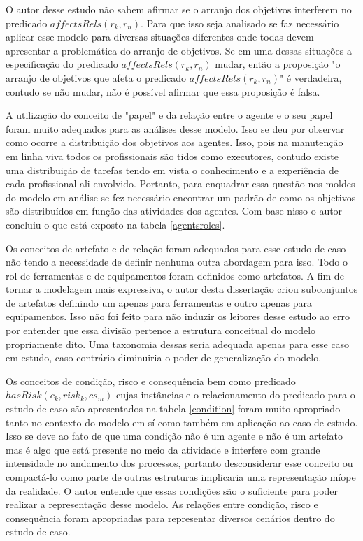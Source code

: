 O autor desse estudo não sabem afirmar se o arranjo dos objetivos interferem no predicado $affectsRels(r_k,r_n)$. Para que isso seja analisado se faz necessário aplicar esse modelo para diversas situações diferentes onde todas devem apresentar a problemática do arranjo de objetivos. Se em uma dessas situações a especificação do predicado $affectsRels(r_k,r_n)$ mudar, então a proposição "o arranjo de objetivos que afeta o predicado $affectsRels(r_k,r_n)$" é verdadeira, contudo se não mudar, não é possível afirmar que essa proposição é falsa. 

A utilização do conceito de "papel" e da relação entre o agente e o seu papel foram muito adequados para as análises desse modelo. Isso se deu por observar como ocorre a distribuição dos objetivos aos agentes. Isso, pois na manutenção em linha viva todos os profissionais são tidos como executores, contudo existe uma distribuição de tarefas tendo em vista o conhecimento e a experiência de cada profissional ali envolvido. Portanto, para enquadrar essa questão nos moldes do modelo em análise se fez necessário encontrar um padrão de como os objetivos são distribuídos em função das atividades dos agentes. Com base nisso o autor concluiu o que está exposto na tabela \ref{agentsroles}.

Os conceitos de artefato e de relação foram adequados para esse estudo de caso não tendo a necessidade de definir nenhuma outra abordagem para isso. Todo o rol de ferramentas e de equipamentos foram definidos como artefatos. A fim de tornar a modelagem mais expressiva, o autor desta dissertação criou subconjuntos de artefatos definindo um apenas para ferramentas e outro apenas para equipamentos. Isso não foi feito para não induzir os leitores desse estudo ao erro por entender que essa divisão pertence a estrutura conceitual do modelo propriamente dito. Uma taxonomia dessas seria adequada apenas para esse caso em estudo, caso contrário diminuiria o poder de generalização do modelo. 

Os conceitos de condição, risco e consequência bem como predicado $hasRisk(c_k,risk_k,cs_m)$ cujas instâncias e o relacionamento do predicado para o estudo de caso são apresentados na tabela \ref{condition} foram muito apropriado tanto no contexto do modelo em sí como também em aplicação ao caso de  estudo. Isso se deve ao fato de que uma condição não é um agente e não é um artefato mas é algo que está presente no meio da atividade e interfere com grande intensidade no andamento dos processos, portanto desconsiderar esse conceito ou compactá-lo como parte de outras estruturas implicaria uma representação míope da realidade. O autor entende que essas condições são o suficiente para poder realizar a representação desse modelo. As relações entre condição, risco e consequência foram apropriadas para representar diversos cenários dentro do estudo de caso. 


